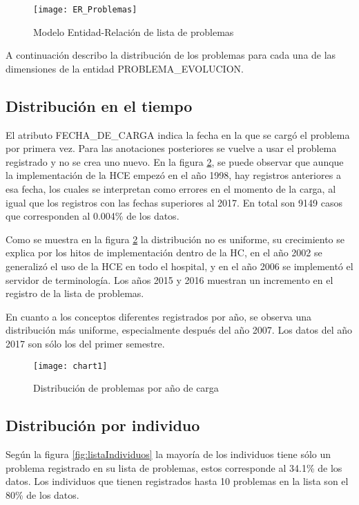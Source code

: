 \begin{figure}[htbp]
\caption{Modelo Entidad-Relación de lista de problemas}
\label{fig:ModeloER}
\centering
\texttt{[image: ER\_Problemas]}
\end{figure}

 A continuación describo la distribución de los problemas para cada una de las dimensiones de la entidad PROBLEMA\_EVOLUCION.
 
\subsection{Distribución en el tiempo}
El atributo FECHA\_DE\_CARGA indica la fecha en la que se cargó el problema por primera vez. Para las anotaciones posteriores se vuelve a usar el problema registrado y no se crea uno nuevo. En la figura \ref{fig:registrosYConceptos}, se puede observar que aunque la implementación de la \acrshort{HCE} empezó en el año 1998, hay registros anteriores a esa fecha, los cuales se interpretan como errores en el momento de la carga, al igual que los registros con las fechas superiores al 2017. En total son \num{9149} casos que corresponden al \num{0,004}\% de los datos.

Como se muestra en la figura \ref{fig:registrosYConceptos} la distribución no es uniforme, su crecimiento se explica por los hitos de implementación dentro de la HC, en el año \num{2002} se generalizó el uso de la HCE en todo el hospital, y en el año \num{2006} se implementó el servidor de terminología. Los años \num{2015} y \num{2016} muestran un incremento en el registro de la lista de problemas.

En cuanto a los conceptos diferentes registrados por año, se observa una distribución más uniforme, especialmente después del año \num{2007}. Los datos del año 2017 son sólo los del primer semestre.

\begin{figure}[htbp]
\caption{Distribución de problemas por año de carga}
\label{fig:registrosYConceptos}
\centering
\texttt{[image: chart1]}
\end{figure}

\subsection{Distribución por individuo}
Según la figura \ref{fig:listaIndividuos} la mayoría de los individuos tiene sólo un problema registrado en su lista de problemas, estos corresponde al \num{34.1}\% de los datos. Los individuos que tienen registrados hasta 10 problemas en la lista son el \num{80}\% de los datos.

